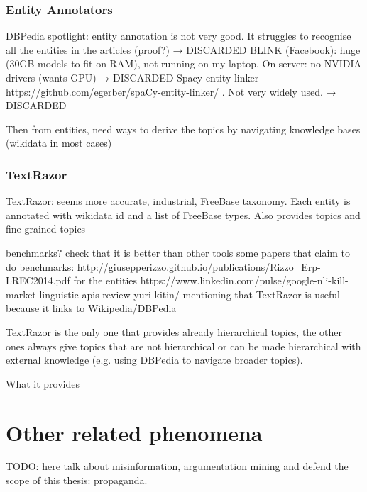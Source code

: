\subsubsection{Entity Annotators}
DBPedia spotlight: entity annotation is not very good. It struggles to recognise all the entities in the articles (proof?) → DISCARDED
BLINK (Facebook): huge (30GB models to fit on RAM), not running on my laptop. On server: no NVIDIA drivers (wants GPU) → DISCARDED
Spacy-entity-linker https://github.com/egerber/spaCy-entity-linker/ . Not very widely used. → DISCARDED

Then from entities, need ways to derive the topics by navigating knowledge bases (wikidata in most cases)

\subsubsection{TextRazor}
TextRazor: seems more accurate, industrial, FreeBase taxonomy. Each entity is annotated with wikidata id and a list of FreeBase types. Also provides topics and fine-grained topics

benchmarks? check that it is better than other tools
some papers that claim to do benchmarks:
http://giusepperizzo.github.io/publications/Rizzo\_Erp-LREC2014.pdf for the entities
https://www.linkedin.com/pulse/google-nli-kill-market-linguistic-apis-review-yuri-kitin/ mentioning that TextRazor is useful because it links to Wikipedia/DBPedia

TextRazor is the only one that provides already hierarchical topics, the other ones always give topics that are not hierarchical or can be made hierarchical with external knowledge (e.g. using DBPedia to navigate broader topics).

What it provides


\section{\statusred Other related phenomena}
\label{sec:lit_related}

TODO: here talk about misinformation, argumentation mining and defend the scope of this thesis: propaganda.

